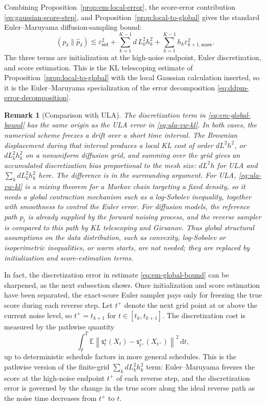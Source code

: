 \documentclass[10pt,a4paper]{amsart}
\numberwithin{equation}{section}
\newtheorem*{remark}{Remark}
\DeclareMathOperator{\KL}{D_{\mathsf{KL}}}
\newcommand{\E}{\mathbb{E}}
\newcommand{\dd}{\,\mathrm{d}}
\newcommand{\wh}[1]{\widehat{#1}}
\newcommand{\eps}{\varepsilon}
\newcommand{\norm}[1]{\left\lVert #1 \right\rVert}
\newcommand{\sstar}{\mathsf{s}^{\star}}
\newcommand{\epsinit}{\varepsilon_{\mathsf{init}}}
\begin{document}
Combining Proposition~\ref{prop:em-local-error}, the score-error contribution
\eqref{eq:gaussian-score-step}, and Proposition~\ref{prop:local-to-global}
gives the standard Euler--Maruyama diffusion-sampling bound:
\begin{equation}\label{eq:em-global-bound}
    \KL(p_\delta\|\wh p_\delta)
    \lesssim
    \epsinit^2
    +
    \sum_{k=1}^{K-1} d\,L_k^2h_k^2
    +
    \sum_{k=1}^{K-1}
    h_k\eps_{k+1,\mathsf{score}}^2.
\end{equation}
The three terms are initialization at the high-noise endpoint, Euler
discretization, and score estimation.  This is the KL telescoping estimate of
Proposition~\ref{prop:local-to-global} with the local Gaussian calculation
inserted, so it is the Euler--Maruyama specialization of the error decomposition
\eqref{eq:ddpm-error-decomposition}.

\begin{remark}[Comparison with ULA]
The discretization term in \eqref{eq:em-global-bound} has the same origin as
the ULA error in \eqref{eq:ula-vw-kl}.  In both cases, the numerical scheme
freezes a drift over a short time interval.  The Brownian displacement during
that interval produces a local KL cost of order $dL^2h^2$, or $dL_k^2h_k^2$ on
a nonuniform diffusion grid, and summing over the grid gives an accumulated
discretization bias proportional to the mesh size: $dL^2h$ for ULA and
$\sum_k dL_k^2h_k^2$ here.  The difference is in the surrounding argument.  For
ULA, \eqref{eq:ula-vw-kl} is a mixing theorem for a Markov chain targeting a
fixed density, so it needs a global contraction mechanism such as a log-Sobolev
inequality, together with smoothness to control the Euler error.  For diffusion
models, the reference path $p_t$ is already supplied by the forward noising
process, and the reverse sampler is compared to this path by KL telescoping and
Girsanov.  Thus global structural assumptions on the data distribution, such as
convexity, log-Sobolev or isoperimetric inequalities, or warm starts, are not
needed; they are replaced by initialization and score-estimation terms.
\end{remark}

In fact, the discretization error in estimate \eqref{eq:em-global-bound} can be sharpened, as the next subsection shows.  Once
initialization and score estimation have been separated, the exact-score Euler
sampler pays only for freezing the true score
during each reverse step.  Let $t^+$ denote the next grid point at or above the
current noise level, so $t^+=t_{k+1}$ for $t\in[t_k,t_{k+1}]$.  The
discretization cost is measured by the pathwise quantity
\begin{equation}\label{eq:cll-bottleneck}
    \int_\delta^T
    \E\norm{
        \sstar_t(X_t)-\sstar_{t^+}(X_{t^+})
    }^2\dd t,
\end{equation}
up to deterministic schedule factors in more general schedules.  This is the
pathwise version of the finite-grid $\sum_k dL_k^2h_k^2$ term:
Euler--Maruyama freezes the score at the high-noise endpoint $t^+$ of each
reverse step, and the discretization error is governed by the change in the
true score along the ideal reverse path as the noise time decreases from
$t^+$ to $t$.
\end{document}
